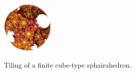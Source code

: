 \documentclass[suppldata, dvipdfmx]{interact}
\theoremstyle{plain}%
\theoremstyle{definition}
\theoremstyle{remark}
\theoremstyle{problemstyle}
\begin{document}
\begin{figure}[H]
 \hspace*{\fill}
 \begin{minipage}[t]{0.18\textwidth}
  \centering
  \includegraphics[width=1in, height=1in, keepaspectratio]{./img/constructFractal/finiteProcess/final.png}
  \label{fig:sphaira-final}
 \end{minipage}
 \hspace*{\fill}
 \caption{Tiling of a finite cube-type sphairahedron.}
 \label{fig:sphairahedronTile}
\end{figure}
\end{document}
